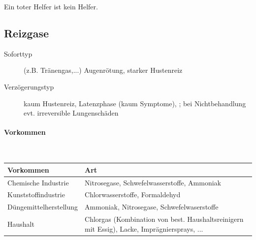 Ein toter Helfer ist kein Helfer.

\subsection{Reizgase}

\begin{description}
    \item[Soforttyp] (z.B. Tränengas,...) Augenrötung, starker Hustenreiz
    \item[Verzögerungstyp]  kaum
    Hustenreiz, Latenzphase (kaum Symptome), ; bei Nichtbehandlung evt.
    irreversible Lungenschäden
\end{description}

\paragraph{Vorkommen}~

\begin{tabulary}{\linewidth}{LL}
\toprule
Vorkommen & Art
\\\midrule
Chemische Industrie 
&
Nitrosegase,  Schwefelwasserstoffe, Ammoniak
\\\addlinespace
Kunststoffindustrie 
&
Chlorwasserstoffe,  Formaldehyd
\\\addlinespace
Düngemittelherstellung 
&
Ammoniak,  Nitrosegase, Schwefelwaserstoffe
\\\addlinespace
Haushalt 
&
Chlorgas (Kombination von best.  Haushaltsreinigern mit
Essig), Lacke,  Imprägniersprays, ...
\\\bottomrule
\end{tabulary}



